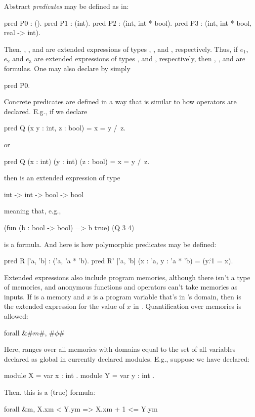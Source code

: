 Abstract \emph{predicates} may be defined as in:
\begin{easycrypt}{}{}
pred P0 : ().
pred P1 : (int).
pred P2 : (int, int * bool).
pred P3 : (int, int * bool, real -> int).
\end{easycrypt}
Then, , ,  and  are extended expressions
of types , , 
and , respectively.
Thus, if $e_1$, $e_2$ and $e_3$ are extended expressions of types
,  and , respectively, then
, ,  and  are formulas.
One may also declare  by simply
\begin{easycrypt}{}{}
pred P0.
\end{easycrypt}

Concrete predicates are defined in a way that is similar to how
operators are declared.  E.g., if we declare
\begin{easycrypt}{}{}
pred Q (x y : int, z : bool) = x = y /\ z.
\end{easycrypt}
or
\begin{easycrypt}{}{}
pred Q (x : int) (y : int) (z : bool) = x = y /\ z.
\end{easycrypt}
then  is an extended expression of type
\begin{easycrypt}{}{}
int -> int -> bool -> bool
\end{easycrypt}
meaning that, e.g.,
\begin{easycrypt}{}{}
(fun (b : bool -> bool) => b true) (Q 3 4)
\end{easycrypt}
is a formula.
And here is how polymorphic predicates may be defined:
\begin{easycrypt}{}{}
pred R ['a, 'b] : ('a, 'a * 'b).
pred R' ['a, 'b] (x : 'a, y : 'a * 'b) = (y.`1 = x).
\end{easycrypt}

Extended expressions also include program memories, although there
isn't a type of memories, and anonymous functions and operators can't
take memories as inputs.  If  is a memory and $x$ is a
program variable that's in 's domain, then  is
the extended expression for the value of $x$ in .
Quantification over memories is allowed:
\begin{easycrypt}{}{}
forall &#$m$#, #$\phi$#
\end{easycrypt}
Here,  ranges over all memories with domains equal to the
set of all variables declared as global in currently declared modules.
E.g., suppose we have declared:
\begin{easycrypt}{}{}
module X = { var x : int }.
module Y = { var y : int }.
\end{easycrypt}
Then, this is a (true) formula:
\begin{easycrypt}{}{}
forall &m, X.x{m} < Y.y{m} => X.x{m} + 1 <= Y.y{m}
\end{easycrypt}

